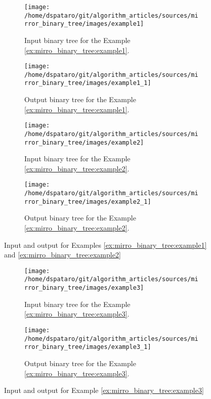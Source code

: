 \begin{figure}
	\centering
	\begin{subfigure}[b]{0.25\textwidth}
	   \texttt{[image: /home/dspataro/git/algorithm\_articles/sources/mirror\_binary\_tree/images/example1]}
	   \caption{Input binary tree for the Example \ref{ex:mirro_binary_tree:example1}.}
	   \label{fig:mirro_binary_tree:example1}
	\end{subfigure}
	\hfill
	\begin{subfigure}[b]{0.4\textwidth}
	   \texttt{[image: /home/dspataro/git/algorithm\_articles/sources/mirror\_binary\_tree/images/example1\_1]}
	   \caption{Output binary tree for the Example \ref{ex:mirro_binary_tree:example1}.}
	   \label{fig:mirro_binary_tree:example1_1}
	\end{subfigure}
	\centering
	\begin{subfigure}[b]{0.4\textwidth}
	   \texttt{[image: /home/dspataro/git/algorithm\_articles/sources/mirror\_binary\_tree/images/example2]}
	   \caption{Input binary tree for the Example \ref{ex:mirro_binary_tree:example2}.}
	   \label{fig:mirro_binary_tree:example2}
	\end{subfigure}
	\hfill
	\begin{subfigure}[b]{0.4\textwidth}
	   \texttt{[image: /home/dspataro/git/algorithm\_articles/sources/mirror\_binary\_tree/images/example2\_1]}
	   \caption{Output binary tree for the Example \ref{ex:mirro_binary_tree:example2}.}
	   \label{fig:mirro_binary_tree:example2_1}
	\end{subfigure}
	\centering

	 \caption[]{Input and output for Examples \ref{ex:mirro_binary_tree:example1} and
	 \ref{ex:mirro_binary_tree:example2}}
\end{figure}


\begin{figure}
	\centering
	\begin{subfigure}[b]{0.4\textwidth}
		\texttt{[image: /home/dspataro/git/algorithm\_articles/sources/mirror\_binary\_tree/images/example3]}
		\caption{Input binary tree for the Example \ref{ex:mirro_binary_tree:example3}.}
		\label{fig:mirro_binary_tree:example3}
	 \end{subfigure}
	 \hfill
	 \begin{subfigure}[b]{0.4\textwidth}
		\texttt{[image: /home/dspataro/git/algorithm\_articles/sources/mirror\_binary\_tree/images/example3\_1]}
		\caption{Output binary tree for the Example \ref{ex:mirro_binary_tree:example3}.}
		\label{fig:mirro_binary_tree:example3_1}
	 \end{subfigure}
	 \caption[]{Input and output for Example \ref{ex:mirro_binary_tree:example3}}

\end{figure}



